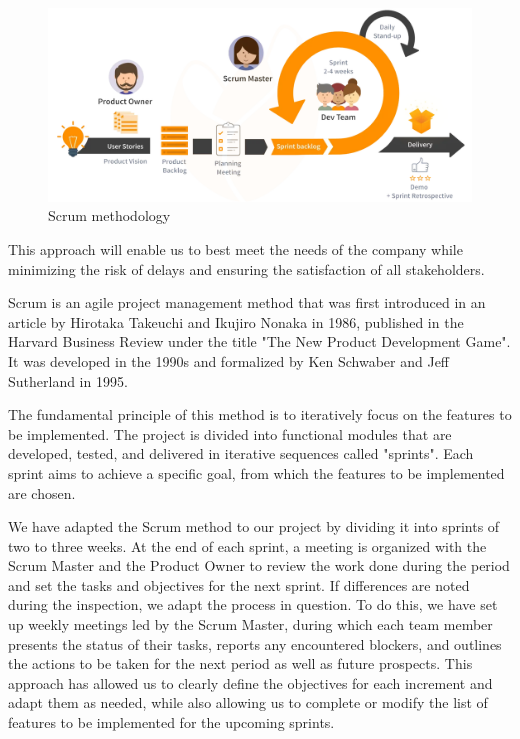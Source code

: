 \begin{figure}[H]
  \centering
  \includegraphics[width=17.5cm]{Figures/scrum.png}
  \caption{Scrum methodology}
\end{figure}

This approach will enable us to best meet the needs of the company while minimizing the risk of delays and ensuring the satisfaction of all stakeholders.

Scrum is an agile project management method that was first introduced in an article by Hirotaka Takeuchi and Ikujiro Nonaka in 1986, published in the Harvard Business Review under the title "The New Product Development Game". It was developed in the 1990s and formalized by Ken Schwaber and Jeff Sutherland in 1995.

The fundamental principle of this method is to iteratively focus on the features to be implemented. The project is divided into functional modules that are developed, tested, and delivered in iterative sequences called "sprints". Each sprint aims to achieve a specific goal, from which the features to be implemented are chosen.

We have adapted the Scrum method to our project by dividing it into sprints of two to three weeks. At the end of each sprint, a meeting is organized with the Scrum Master and the Product Owner to review the work done during the period and set the tasks and objectives for the next sprint. If differences are noted during the inspection, we adapt the process in question. To do this, we have set up weekly meetings led by the Scrum Master, during which each team member presents the status of their tasks, reports any encountered blockers, and outlines the actions to be taken for the next period as well as future prospects. This approach has allowed us to clearly define the objectives for each increment and adapt them as needed, while also allowing us to complete or modify the list of features to be implemented for the upcoming sprints.

